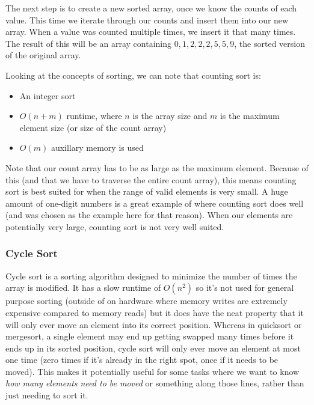 The next step is to create a new sorted array, once we know the counts of each value. This time we iterate through our counts and insert them into our new array. When a value was counted multiple times, we insert it that many times. The result of this will be an array containing $0,1,2,2,2,5,5,9$, the sorted version of the original array.


Looking at the concepts of sorting, we can note that counting sort is:
\begin{itemize}
\item An integer sort
\item $O(n+m)$ runtime, where $n$ is the array size and $m$ is the maximum element size (or size of the count array)
\item $O(m)$ auxillary memory is used
\end{itemize}

Note that our count array has to be as large as the maximum element. Because of this (and that we have to traverse the entire count array), this means counting sort is best suited for when the range of valid elements is very small. A huge amount of one-digit numbers is a great example of where counting sort does well (and was chosen as the example here for that reason). When our elements are potentially very large, counting sort is not very well suited.

\subsubsection{Cycle Sort}
 

Cycle sort is a sorting algorithm designed to minimize the number of times the array is modified. It has a slow runtime of $O(n^2)$ so it's not used for general purpose sorting (outside of on hardware where memory writes are extremely expensive compared to memory reads) but it does have the neat property that it will only ever move an element into its correct position. Whereas in quicksort or mergesort, a single element may end up getting swapped many times before it ends up in its sorted position, cycle sort will only ever move an element at most one time (zero times if it's already in the right spot, once if it needs to be moved). This makes it potentially useful for some tasks where we want to know \textit{how many elements need to be moved} or something along those lines, rather than just needing to sort it.

